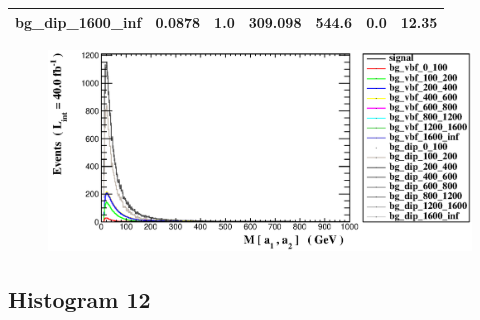 \documentclass[a4paper, 10pt]{article}
\begin{document}
\begin{table}[H]
\begin{center}
\begin{tabular}{|m{23.0mm}|m{23.0mm}|m{18.0mm}|m{19.0mm}|m{19.0mm}|m{19.0mm}|m{19.0mm}|}
      \hline
      {\cellcolor{white}         bg\_dip\_1600\_inf}& {\cellcolor{white}         0.0878}& {\cellcolor{white}         1.0}& {\cellcolor{white}         309.098}& {\cellcolor{white}         544.6}& {\cellcolor{orange}         0.0}& {\cellcolor{orange}         12.35}\\
\hline
    \end{tabular}
  \end{center}
\end{table}

\begin{figure}[H]
  \begin{center}
    \includegraphics[scale=0.45]{selection_10.eps}\\
\caption{   }
  \end{center}
\end{figure}
      \newpage
\subsection{ Histogram 12}
\end{document}
